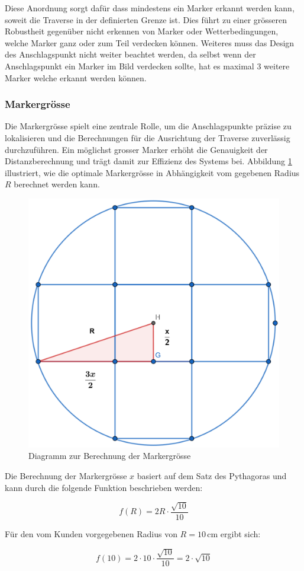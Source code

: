 Diese Anordnung sorgt dafür dass mindestens ein Marker erkannt werden kann, soweit die Traverse in der definierten Grenze ist. 
Dies führt zu einer grösseren Robustheit gegenüber nicht erkennen von Marker oder Wetterbedingungen, welche Marker ganz oder zum Teil verdecken können.
Weiteres muss das Design des Anschlagspunkt nicht weiter beachtet werden, da selbst wenn der Anschlagspunkt ein Marker im Bild verdecken sollte, hat es maximal 3 weitere Marker welche erkannt werden können.


\subsubsection{Markergrösse}

Die Markergrösse spielt eine zentrale Rolle, um die Anschlagspunkte präzise zu lokalisieren und 
die Berechnungen für die Ausrichtung der Traverse zuverlässig durchzuführen. Ein möglichst grosser 
Marker erhöht die Genauigkeit der Distanzberechnung und trägt damit zur Effizienz des Systems bei. 
Abbildung \ref{fig:marker} illustriert, wie die optimale Markergrösse in Abhängigkeit vom gegebenen 
Radius \( R \) berechnet werden kann.

\begin{figure}[H]
    \centering
    \includegraphics[width=0.5\linewidth]{graphics/marker.png}
    \caption{Diagramm zur Berechnung der Markergrösse}
    \label{fig:marker}
\end{figure}

Die Berechnung der Markergrösse \( x \) basiert auf dem Satz des Pythagoras und kann durch die folgende Funktion beschrieben werden:

\[
f(R) = 2R \cdot \frac{\sqrt{10}}{10}
\]

Für den vom Kunden vorgegebenen Radius von \( R = 10 \, \mathrm{cm} \) ergibt sich:

\[
f(10) = 2 \cdot 10 \cdot \frac{\sqrt{10}}{10} = 2 \cdot \sqrt{10}
\]

